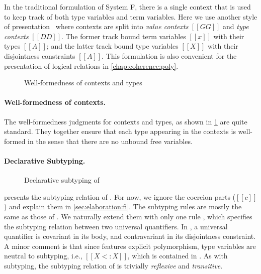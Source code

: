 In the traditional formulation of System F, there is a single context that is
used to keep track of both type variables and term variables. Here we use
another style of presentation~\citep[chap. 16]{Harper_2016} where contexts are
split into \textit{value contexts} $[[GG]]$ and \textit{type contexts} $[[DD]]$.
The former track bound term variables $[[x]]$ with their types $[[A]]$; and the
latter track bound type variables $[[X]]$ with their disjointness constraints
$[[A]]$. This formulation is also convenient for the presentation of logical
relations in \cref{chap:coherence:poly}.

\begin{figure}
  \centering
  \caption{Well-formedness of contexts and types}
  \label{fig:well-formedness:fi}
\end{figure}

\paragraph{Well-formedness of contexts.}

The well-formedness judgments for contexts and types, as shown in
\cref{fig:well-formedness:fi} are quite standard. They together ensure that each
type appearing in the contexts is well-formed in the sense that there are no
unbound free variables.


\paragraph{Declarative Subtyping.}


\begin{figure}[h]
  \centering
  \caption{Declarative subtyping of \fnamee}
  \label{fig:subtyping:fi}
\end{figure}

 presents the subtyping relation of \fnamee. For now, we
ignore the coercion parts ($[[c]]$) and explain them in
\cref{sec:elaboration:fi}. The subtyping rules are mostly the same as those of
\namee. We naturally extend them with only one rule , which
specifies the subtyping relation between two universal quantifiers. In
, a universal quantifier is covariant in its body, and
contravariant in its disjointness constraint. A minor comment is that since
\fnamee features explicit polymorphism, type variables are neutral to subtyping,
i.e., $[[X <: X]]$, which is contained in . As with \namee
subtyping, the subtyping relation of \fnamee is trivially \textit{reflexive} and \textit{transitive}.

